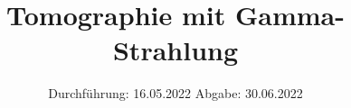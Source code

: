 

\subject{V14}
\title{Tomographie mit Gamma-Strahlung}
\date{%
  Durchführung: 16.05.2022
  \hspace{3em}
  Abgabe: 30.06.2022%
}



\maketitle
\thispagestyle{empty}
\tableofcontents
\newpage







\printbibliography{}


